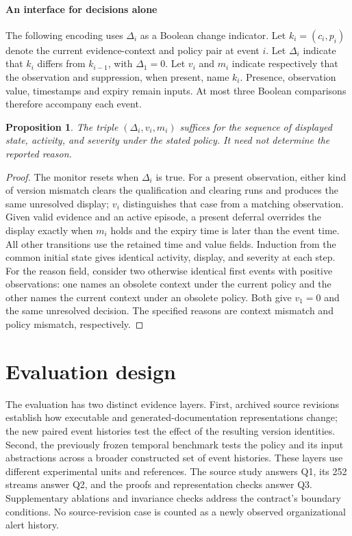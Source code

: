 \documentclass[preprint,11pt]{elsarticle}
\newtheorem{proposition}{Proposition}
\begin{document}
\paragraph{An interface for decisions alone}
The following encoding uses $\Delta_i$ as a Boolean change indicator. Let $k_i=(c_i,p_i)$ denote the current evidence-context and policy pair at event $i$. Let $\Delta_i$ indicate that $k_i$ differs from $k_{i-1}$, with $\Delta_1=0$. Let $v_i$ and $m_i$ indicate respectively that the observation and suppression, when present, name $k_i$. Presence, observation value, timestamps and expiry remain inputs. At most three Boolean comparisons therefore accompany each event.
\begin{proposition}\label{prop:three-comparison}
The triple $(\Delta_i,v_i,m_i)$ suffices for the sequence of displayed state, activity, and severity under the stated policy. It need not determine the reported reason.
\end{proposition}
\begin{proof}
The monitor resets when $\Delta_i$ is true. For a present observation, either kind of version mismatch clears the qualification and clearing runs and produces the same unresolved display; $v_i$ distinguishes that case from a matching observation. Given valid evidence and an active episode, a present deferral overrides the display exactly when $m_i$ holds and the expiry time is later than the event time. All other transitions use the retained time and value fields. Induction from the common initial state gives identical activity, display, and severity at each step. For the reason field, consider two otherwise identical first events with positive observations: one names an obsolete context under the current policy and the other names the current context under an obsolete policy. Both give $v_1=0$ and the same unresolved decision. The specified reasons are context mismatch and policy mismatch, respectively.
\end{proof}

\section{Evaluation design}
The evaluation has two distinct evidence layers. First, archived source revisions establish how executable and generated-documentation representations change; the new paired event histories test the effect of the resulting version identities. Second, the previously frozen temporal benchmark tests the policy and its input abstractions across a broader constructed set of event histories. These layers use different experimental units and references. The source study answers Q1, its 252 streams answer Q2, and the proofs and representation checks answer Q3. Supplementary ablations and invariance checks address the contract's boundary conditions. No source-revision case is counted as a newly observed organizational alert history.
\end{document}
